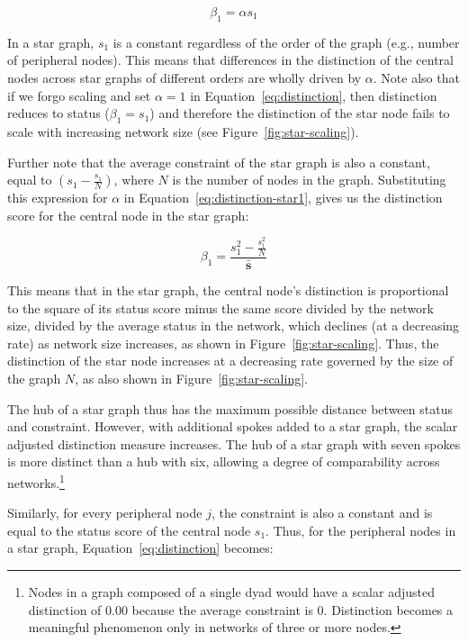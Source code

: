 \documentclass[12pt]{article}
\begin{document}
\begin{equation}
    \beta_1 = \alpha s_1
    \label{eq:distinction-star1}
\end{equation}

In a star graph, $s_1$ is a constant regardless of the order of the graph (e.g., number of peripheral nodes). This means that differences in the distinction of the central nodes across star graphs of different orders are wholly driven by $\alpha$. Note also that if we forgo scaling and set $\alpha = 1$ in Equation~\ref{eq:distinction}, then distinction reduces to status ($\beta_1 = s_1$) and therefore the distinction of the star node fails to scale with increasing network size (see Figure~\ref{fig:star-scaling}).

Further note that the average constraint of the star graph is also a constant, equal to $\left(s_1-\frac{s_1}{N}\right)$, where $N$ is the number of nodes in the graph. Substituting this expression for $\alpha$ in Equation~\ref{eq:distinction-star1}, gives us the distinction score for the central node in the star graph:

\begin{equation}
    \beta_1 =\frac{s_1^2-\frac{s_1^2}{N}}{\bar{\mathbf{s}}}
    \label{eq:distinction-star2}
\end{equation}

This means that in the star graph, the central node's distinction is proportional to the square of its status score minus the same score divided by the network size, divided by the average status in the network, which declines (at a decreasing rate) as network size increases, as shown in Figure~\ref{fig:star-scaling}. Thus, the distinction of the star node increases at a decreasing rate governed by the size of the graph $N$, as also shown in Figure~\ref{fig:star-scaling}. 

The hub of a star graph thus has the maximum possible distance between status and constraint. However, with additional spokes added to a star graph, the scalar adjusted distinction measure increases. The hub of a star graph with seven spokes is more distinct than a hub with six, allowing a degree of comparability across networks.\footnote{Nodes in a graph composed of a single dyad would have a scalar adjusted distinction of 0.00 because the average constraint is 0. Distinction becomes a meaningful phenomenon only in networks of three or more nodes.} 



Similarly, for every peripheral node $j$, the constraint is also a constant and is equal to the status score of the central node $s_1$. Thus, for the peripheral nodes in a star graph, Equation~\ref{eq:distinction} becomes:
\end{document}
